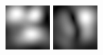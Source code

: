 \begin{figure}[ht]
\begin{center}
 \includegraphics[width=\columnwidth/9]{ch4/figures/mag_3_5.jpg}
 \includegraphics[width=\columnwidth/9]{ch4/figures/mag_3_6.jpg}

\end{center}
\end{figure}

